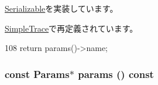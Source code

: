 \hyperlink{classSerializable_a2d319721a65496069642871a52e47056}{Serializable}を実装しています。

\hyperlink{classSimpleTrace_a6490f765a824ced1cc94979609fe7e07}{SimpleTrace}で再定義されています。


\begin{DoxyCode}
108 { return params()->name; }
\end{DoxyCode}
\hypertarget{classSimObject_acd3c3feb78ae7a8f88fe0f110a718dff}{
\subsubsection[{params}]{\setlength{\rightskip}{0pt plus 5cm}const {\bf Params}$\ast$ params () const}}
\label{classSimObject_acd3c3feb78ae7a8f88fe0f110a718dff}


